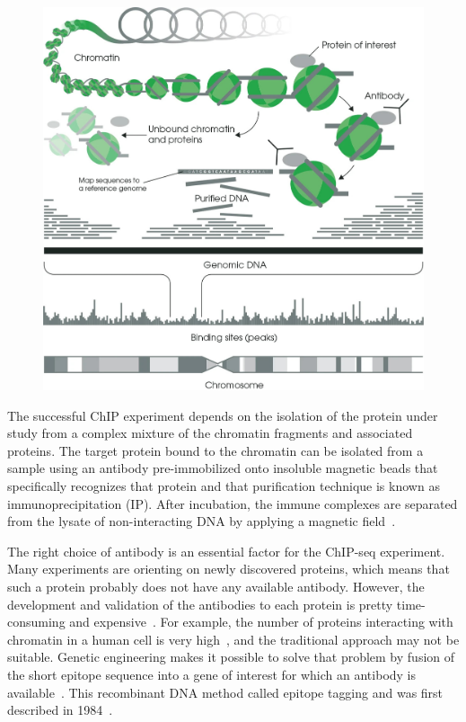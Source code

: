 \begin{figure}[b!]
    \centering
    \includegraphics[width=\textwidth]{../img/chip.jpeg}
    \label{fig:graph_classes}
\end{figure}

The successful ChIP experiment depends on the isolation of the protein under study from a complex mixture of the chromatin fragments and associated proteins. 
The target protein bound to the chromatin can be isolated from a sample using an antibody pre-immobilized onto insoluble magnetic beads that specifically recognizes that protein and that purification technique is known as immunoprecipitation (IP). 
After incubation, the immune complexes are separated from the lysate of non-interacting DNA by applying a magnetic field~\cite{slovakova2005use}.

The right choice of antibody is an essential factor for the ChIP-seq experiment. 
Many experiments are orienting on newly discovered proteins, which means that such a protein probably does not have any available antibody. 
However, the development and validation of the antibodies to each protein is pretty time-consuming and expensive~\cite{jarvik1998epitope}. 
For example, the number of proteins interacting with chromatin in a human cell is very high~\cite{ramani2005consolidating}, and the traditional approach may not be suitable.
Genetic engineering makes it possible to solve that problem by fusion of the short epitope sequence into a gene of interest for which an antibody is available~\cite{jarvik1998epitope,brizzard2008epitope,goldberg2010distinct}. 
This recombinant DNA method called epitope tagging and was first described in 1984~\cite{munro1984use}. 

